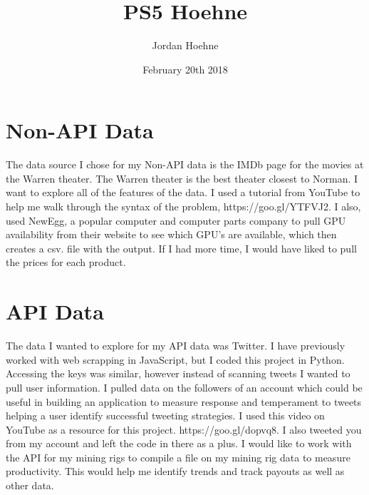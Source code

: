 \documentclass{article}
\title{PS5 Hoehne}
\author{Jordan Hoehne }
\date{February 20th 2018}
\begin{document}
\maketitle

\section{Non-API Data}
The data source I chose for my Non-API data is the IMDb page for the movies at the Warren theater. The Warren theater is the best theater closest to Norman. I want to explore all of the features of the data. I used a tutorial from YouTube to help me walk through the syntax of the problem, https://goo.gl/YTFVJ2. I also, used NewEgg, a popular computer and computer parts company to pull GPU availability from their website to see which GPU's are available, which then creates a csv. file with the output. If I had more time, I would have liked to pull the prices for each product.


\section{API Data}
The data I wanted to explore for my API data was Twitter. I have previously worked with web scrapping in JavaScript, but I coded this project in Python. Accessing the keys was similar, however instead of scanning tweets I wanted to pull user information. I pulled data on the followers of an account which could be useful in building an application to measure response and temperament to tweets helping a user identify successful tweeting strategies. I used this video on YouTube as a resource for this project. https://goo.gl/dopvq8. I also tweeted you from my account and left the code in there as a plus. I would like to work with the API for my mining rigs to compile a file on my mining rig data to measure productivity. This would help me identify trends and track payouts as well as other data.

\centering
\end{document}
